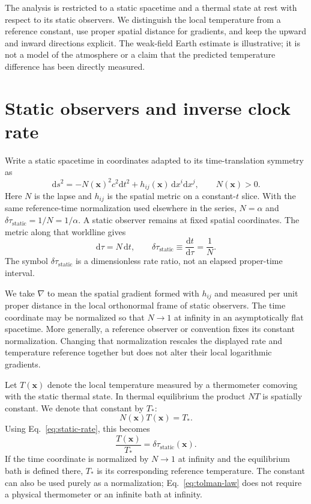 \documentclass[12pt]{article}
\begin{document}
The analysis is restricted to a static spacetime and a thermal state at rest with respect to its static observers. We distinguish the local temperature from a reference constant, use proper spatial distance for gradients, and keep the upward and inward directions explicit. The weak-field Earth estimate is illustrative; it is not a model of the atmosphere or a claim that the predicted temperature difference has been directly measured.

\section{Static observers and inverse clock rate}

Write a static spacetime in coordinates adapted to its time-translation symmetry as
\begin{equation}
  \mathrm{d}s^2=-N(\mathbf{x})^2c^2\mathrm{d}t^2
    +h_{ij}(\mathbf{x})\,\mathrm{d}x^i\mathrm{d}x^j,
  \qquad N(\mathbf{x})>0.
  \label{eq:static-metric}
\end{equation}
Here $N$ is the lapse and $h_{ij}$ is the spatial metric on a constant-$t$ slice. With the same reference-time normalization used elsewhere in the series, $N=\alpha$ and $\delta\tau_{\mathrm{static}}=1/N=1/\alpha$. A static observer remains at fixed spatial coordinates. The metric along that worldline gives
\begin{equation}
  \mathrm{d}\tau=N\,\mathrm{d}t,
  \qquad
  \delta\tau_{\mathrm{static}}
  \equiv\frac{\mathrm{d}t}{\mathrm{d}\tau}=\frac{1}{N}.
  \label{eq:static-rate}
\end{equation}
The symbol $\delta\tau_{\mathrm{static}}$ is a dimensionless rate ratio, not an elapsed proper-time interval.

We take $\nabla$ to mean the spatial gradient formed with $h_{ij}$ and measured per unit proper distance in the local orthonormal frame of static observers. The time coordinate may be normalized so that $N\to1$ at infinity in an asymptotically flat spacetime. More generally, a reference observer or convention fixes its constant normalization. Changing that normalization rescales the displayed rate and temperature reference together but does not alter their local logarithmic gradients.

Let $T(\mathbf{x})$ denote the local temperature measured by a thermometer comoving with the static thermal state. In thermal equilibrium the product $N T$ is spatially constant. We denote that constant by $T_*$:
\begin{equation}
  N(\mathbf{x})T(\mathbf{x})=T_*.
  \label{eq:tolman-law}
\end{equation}
Using Eq.~\eqref{eq:static-rate}, this becomes
\begin{equation}
  \frac{T(\mathbf{x})}{T_*}
  =\delta\tau_{\mathrm{static}}(\mathbf{x}).
  \label{eq:temperature-inverse-rate}
\end{equation}
If the time coordinate is normalized by $N\to1$ at infinity and the equilibrium bath is defined there, $T_*$ is its corresponding reference temperature. The constant can also be used purely as a normalization; Eq.~\eqref{eq:tolman-law} does not require a physical thermometer or an infinite bath at infinity.
\end{document}
